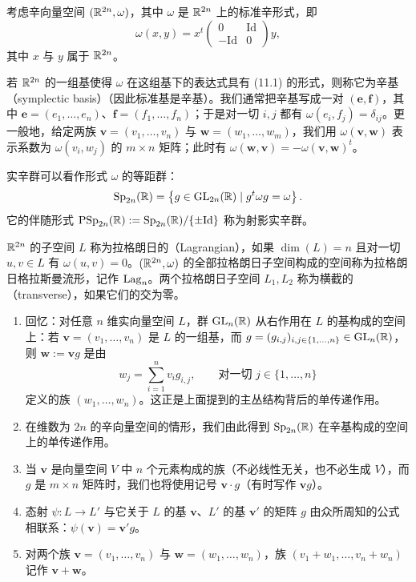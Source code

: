 
考虑辛向量空间 $(\mathbb{R}^{2n},\omega)$，其中 $\omega$ 是 $\mathbb{R}^{2n}$ 上的标准辛形式，即
\begin{equation}
\omega(x,y)=x^{t}\begin{pmatrix} 0 & \mathrm{Id}\\ -\mathrm{Id} & 0\end{pmatrix}y, \tag{11.1}
\end{equation}
其中 $x$ 与 $y$ 属于 $\mathbb{R}^{2n}$。

若 $\mathbb{R}^{2n}$ 的一组基使得 $\omega$ 在这组基下的表达式具有 (11.1) 的形式，则称它为辛基（symplectic basis）（因此标准基是辛基）。我们通常把辛基写成一对 $(\mathbf{e},\mathbf{f})$，其中 $\mathbf{e}=(e_1,\dots,e_n)$、$\mathbf{f}=(f_1,\dots,f_n)$；于是对一切 $i,j$ 都有 $\omega(e_i,f_j)=\delta_{ij}$。更一般地，给定两族 $\mathbf{v}=(v_1,\dots,v_n)$ 与 $\mathbf{w}=(w_1,\dots,w_m)$，我们用 $\omega(\mathbf{v},\mathbf{w})$ 表示系数为 $\omega(v_i,w_j)$ 的 $m\times n$ 矩阵；此时有 $\omega(\mathbf{w},\mathbf{v})=-\omega(\mathbf{v},\mathbf{w})^{t}$。

实辛群可以看作形式 $\omega$ 的等距群：
\[
\operatorname{Sp}_{2n}(\mathbb{R})=\left\{g\in\operatorname{GL}_{2n}(\mathbb{R})\mid g^{t}\omega g=\omega\right\}.
\]
它的伴随形式 $\mathrm{PSp}_{2n}(\mathbb{R}):=\operatorname{Sp}_{2n}(\mathbb{R})/\{\pm\mathrm{Id}\}$ 称为射影实辛群。

\begin{definition}[11.6]
$\mathbb{R}^{2n}$ 的子空间 $L$ 称为拉格朗日的（Lagrangian），如果 $\dim(L)=n$ 且对一切 $u,v\in L$ 有 $\omega(u,v)=0$。$(\mathbb{R}^{2n},\omega)$ 的全部拉格朗日子空间构成的空间称为拉格朗日格拉斯曼流形，记作 $\operatorname{Lag}_n$。两个拉格朗日子空间 $L_1,L_2$ 称为横截的（transverse），如果它们的交为零。
\end{definition}

\begin{remark}[11.7]
\begin{enumerate}[label=\arabic*.,leftmargin=*]
\item 回忆：对任意 $n$ 维实向量空间 $L$，群 $\operatorname{GL}_n(\mathbb{R})$ 从右作用在 $L$ 的基构成的空间上：若 $\mathbf{v}=(v_1,\dots,v_n)$ 是 $L$ 的一组基，而 $g=(g_{i,j})_{i,j\in\{1,\dots,n\}}\in\operatorname{GL}_n(\mathbb{R})$，则 $\mathbf{w}:=\mathbf{v}g$ 是由
\[
w_j=\sum_{i=1}^{n}v_i g_{i,j},\qquad \text{对一切 } j\in\{1,\dots,n\}
\]
定义的族 $(w_1,\dots,w_n)$。这正是上面提到的主丛结构背后的单传递作用。
\item 在维数为 $2n$ 的辛向量空间的情形，我们由此得到 $\operatorname{Sp}_{2n}(\mathbb{R})$ 在辛基构成的空间上的单传递作用。
\item 当 $\mathbf{v}$ 是向量空间 $V$ 中 $n$ 个元素构成的族（不必线性无关，也不必生成 $V$），而 $g$ 是 $m\times n$ 矩阵时，我们也将使用记号 $\mathbf{v}\cdot g$（有时写作 $\mathbf{v}g$）。
\item 态射 $\psi\colon L\to L'$ 与它关于 $L$ 的基 $\mathbf{v}$、$L'$ 的基 $\mathbf{v}'$ 的矩阵 $g$ 由众所周知的公式相联系：$\psi(\mathbf{v})=\mathbf{v}'g$。
\item 对两个族 $\mathbf{v}=(v_1,\dots,v_n)$ 与 $\mathbf{w}=(w_1,\dots,w_n)$，族 $(v_1+w_1,\dots,v_n+w_n)$ 记作 $\mathbf{v}+\mathbf{w}$。
\end{enumerate}
\end{remark}

